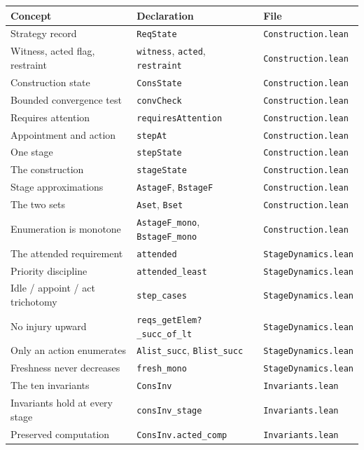 \begin{table}[h]
\centering
\small
\begin{tabular}{lll}
\toprule
Concept & Declaration & File \\
\midrule
Strategy record & \texttt{ReqState} & \texttt{Construction.lean} \\
Witness, acted flag, restraint & \texttt{witness}, \texttt{acted}, \texttt{restraint} & \texttt{Construction.lean} \\
Construction state & \texttt{ConsState} & \texttt{Construction.lean} \\
Bounded convergence test & \texttt{convCheck} & \texttt{Construction.lean} \\
Requires attention & \texttt{requiresAttention} & \texttt{Construction.lean} \\
Appointment and action & \texttt{stepAt} & \texttt{Construction.lean} \\
One stage & \texttt{stepState} & \texttt{Construction.lean} \\
The construction & \texttt{stageState} & \texttt{Construction.lean} \\
Stage approximations & \texttt{AstageF}, \texttt{BstageF} & \texttt{Construction.lean} \\
The two sets & \texttt{Aset}, \texttt{Bset} & \texttt{Construction.lean} \\
Enumeration is monotone & \texttt{AstageF\_mono}, \texttt{BstageF\_mono} & \texttt{Construction.lean} \\
The attended requirement & \texttt{attended} & \texttt{StageDynamics.lean} \\
Priority discipline & \texttt{attended\_least} & \texttt{StageDynamics.lean} \\
Idle / appoint / act trichotomy & \texttt{step\_cases} & \texttt{StageDynamics.lean} \\
No injury upward & \texttt{reqs\_getElem?\_succ\_of\_lt} & \texttt{StageDynamics.lean} \\
Only an action enumerates & \texttt{Alist\_succ}, \texttt{Blist\_succ} & \texttt{StageDynamics.lean} \\
Freshness never decreases & \texttt{fresh\_mono} & \texttt{StageDynamics.lean} \\
The ten invariants & \texttt{ConsInv} & \texttt{Invariants.lean} \\
Invariants hold at every stage & \texttt{consInv\_stage} & \texttt{Invariants.lean} \\
Preserved computation & \texttt{ConsInv.acted\_comp} & \texttt{Invariants.lean} \\

\end{tabular}
\end{table}
